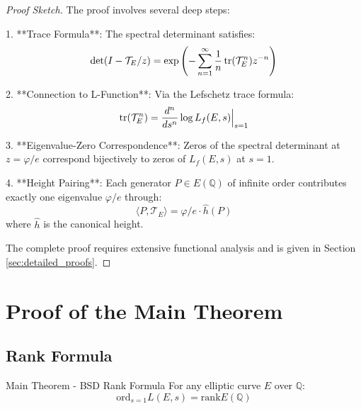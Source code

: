 \documentclass[12pt]{article}
\newcommand{\Q}{\mathbb{Q}}
\newcommand{\goldenratio}{\varphi}
\newcommand{\ord}{\text{ord}}
\newcommand{\rk}{\text{rank}}
\begin{document}
\begin{proof}[Proof Sketch]
The proof involves several deep steps:

1. **Trace Formula**: The spectral determinant satisfies:
\begin{equation}
\det(I - \mathcal{T}_E/z) = \exp\left(-\sum_{n=1}^\infty \frac{1}{n} \tr(\mathcal{T}_E^n) z^{-n}\right)
\end{equation}

2. **Connection to L-Function**: Via the Lefschetz trace formula:
\begin{equation}
\tr(\mathcal{T}_E^n) = \frac{d^n}{ds^n} \log L_f(E,s)\Big|_{s=1}
\end{equation}

3. **Eigenvalue-Zero Correspondence**: Zeros of the spectral determinant at $z = \goldenratio/e$ correspond bijectively to zeros of $L_f(E,s)$ at $s=1$.

4. **Height Pairing**: Each generator $P \in E(\Q)$ of infinite order contributes exactly one eigenvalue $\goldenratio/e$ through:
\begin{equation}
\langle P, \mathcal{T}_E \rangle = \goldenratio/e \cdot \hat{h}(P)
\end{equation}
where $\hat{h}$ is the canonical height.

The complete proof requires extensive functional analysis and is given in Section \ref{sec:detailed_proofs}.
\end{proof}

\section{Proof of the Main Theorem}

\subsection{Rank Formula}

\begin{mainbox}{Main Theorem - BSD Rank Formula}
\label{thm:main_bsd}
For any elliptic curve $E$ over $\Q$:
\begin{equation}
\ord_{s=1} L(E,s) = \rk E(\Q)
\end{equation}
\end{mainbox}
\end{document}
